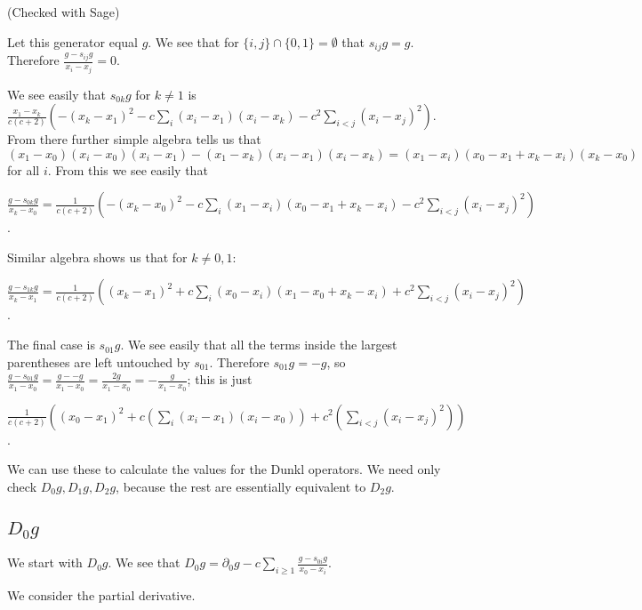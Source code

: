 \documentclass{article}
\numberwithin{equation}{section}
\begin{document}
(Checked with Sage)

Let this generator equal $g$. We see that for $\{i,j\} \cap \{0,1\}=\emptyset$ that $s_{ij}g=g$. Therefore $\frac{g-s_{ij}g}{x_i-x_j}=0$. 

We see easily that $s_{0k}g$ for $k \ne 1$ is $\frac{x_1-x_k}{c(c+2)}\left(-(x_k-x_1)^2-c\sum_i(x_i-x_1)(x_i-x_k)-c^2\sum_{i < j}(x_i-x_j)^2\right)$. From there further simple algebra tells us that $(x_1-x_0)(x_i-x_0)(x_i-x_1)-(x_1-x_k)(x_i-x_1)(x_i-x_k)=(x_1-x_i)(x_0-x_1+x_k-x_i)(x_k-x_0)$ for all $i$. From this we see easily that
 
$\frac{g-s_{0k}g}{x_k-x_0}=\frac{1}{c(c+2)}\left(-(x_k-x_0)^2-c\sum_i (x_1-x_i)(x_0-x_1+x_k-x_i)-c^2\sum_{i < j} (x_i-x_j)^2\right)$. 

Similar algebra shows us that for $k \ne 0,1$:

$\frac{g-s_{1k}g}{x_k-x_1}=\frac{1}{c(c+2)}\left((x_k-x_1)^2+c\sum_i (x_0-x_i)(x_1-x_0+x_k-x_i)+c^2\sum_{i < j} (x_i-x_j)^2\right)$. 

The final case is $s_{01}g$. We see easily that all the terms inside the largest parentheses are left untouched by $s_{01}$. Therefore $s_{01}g=-g$, so $\frac{g-s_{01}g}{x_1-x_0}=\frac{g--g}{x_1-x_0}=\frac{2g}{x_1-x_0}=-\frac{g}{x_1-x_0}$; this is just 

$\frac{1}{c(c+2)}\left((x_0-x_1)^2+c\left(\sum_i (x_i-x_1)(x_i-x_0)\right)+c^2\left(\sum_{ i < j}(x_i-x_j)^2\right)\right)$.





We can use these to calculate the values for the Dunkl operators. We need only check $D_0g,D_1g,D_2g$, because the rest are essentially equivalent to $D_2g$. 

\subsection{$D_0g$}

We start with $D_0g$. We see that $D_0g=\partial_0g-c \sum_{i \ge 1} \frac{g-s_{0i}g}{x_0-x_i}$.

We consider the partial derivative.
\end{document}
